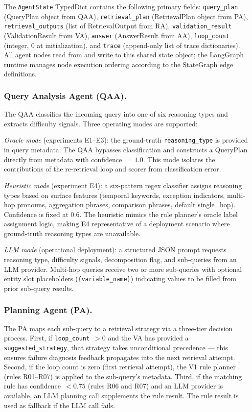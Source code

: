 \documentclass[11pt, a4paper]{article}
\begin{document}
The \texttt{AgentState} TypedDict contains the following primary fields: \texttt{query\_plan} (QueryPlan object from QAA), \texttt{retrieval\_plan} (RetrievalPlan object from PA), \texttt{retrieval\_outputs} (list of RetrievalOutput from RA), \texttt{validation\_result} (ValidationResult from VA), \texttt{answer} (AnswerResult from AA), \texttt{loop\_count} (integer, 0 at initialization), and \texttt{trace} (append-only list of trace dictionaries). All agent nodes read from and write to this shared state object; the LangGraph runtime manages node execution ordering according to the StateGraph edge definitions.

\subsubsection*{Query Analysis Agent (QAA).}

The QAA classifies the incoming query into one of six reasoning types and extracts difficulty signals. Three operating modes are supported:

\textit{Oracle mode} (experiments E1--E3): the ground-truth \texttt{reasoning\_type} is provided in query metadata. The QAA bypasses classification and constructs a QueryPlan directly from metadata with confidence~$=1.0$. This mode isolates the contributions of the re-retrieval loop and scorer from classification error.

\textit{Heuristic mode} (experiment E4): a six-pattern regex classifier assigns reasoning types based on surface features (temporal keywords, exception indicators, multi-hop pronouns, aggregation phrases, comparison phrases, default single\_hop). Confidence is fixed at 0.6. The heuristic mimics the rule planner's oracle label assignment logic, making E4 representative of a deployment scenario where ground-truth reasoning types are unavailable.

\textit{LLM mode} (operational deployment): a structured JSON prompt requests reasoning type, difficulty signals, decomposition flag, and sub-queries from an LLM provider. Multi-hop queries receive two or more sub-queries with optional entity slot placeholders (\texttt{\{variable\_name\}}) indicating values to be filled from prior sub-query results.

\subsubsection*{Planning Agent (PA).}

The PA maps each sub-query to a retrieval strategy via a three-tier decision process. First, if \texttt{loop\_count}~$>0$ and the VA has provided a \texttt{suggested\_strategy}, that strategy takes unconditional precedence --- this ensures failure diagnosis feedback propagates into the next retrieval attempt. Second, if the loop count is zero (first retrieval attempt), the V1 rule planner (rules R01--R07) is applied to the sub-query's metadata. Third, if the matching rule has confidence~$<0.75$ (rules R06 and R07) and an LLM provider is available, an LLM planning call supplements the rule result. The rule result is used as fallback if the LLM call fails.
\end{document}
